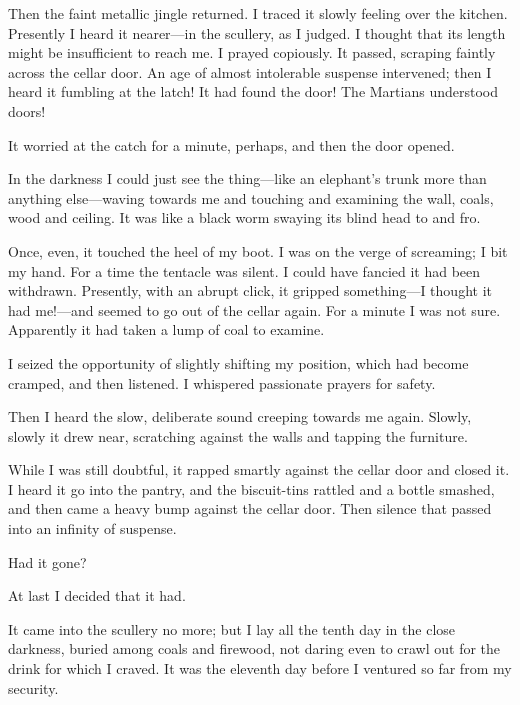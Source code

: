 Then the faint metallic jingle returned. I traced it slowly feeling over the kitchen. Presently I heard it nearer—in the scullery, as I judged. I thought that its length might be insufficient to reach me. I prayed copiously. It passed, scraping faintly across the cellar door. An age of almost intolerable suspense intervened; then I heard it fumbling at the latch! It had found the door! The Martians understood doors!

It worried at the catch for a minute, perhaps, and then the door opened.

In the darkness I could just see the thing—like an elephant's trunk more than anything else—waving towards me and touching and examining the wall, coals, wood and ceiling. It was like a black worm swaying its blind head to and fro.

Once, even, it touched the heel of my boot. I was on the verge of screaming; I bit my hand. For a time the tentacle was silent. I could have fancied it had been withdrawn. Presently, with an abrupt click, it gripped something—I thought it had me!—and seemed to go out of the cellar again. For a minute I was not sure. Apparently it had taken a lump of coal to examine.

I seized the opportunity of slightly shifting my position, which had become cramped, and then listened. I whispered passionate prayers for safety.

Then I heard the slow, deliberate sound creeping towards me again. Slowly, slowly it drew near, scratching against the walls and tapping the furniture.

While I was still doubtful, it rapped smartly against the cellar door and closed it. I heard it go into the pantry, and the biscuit-tins rattled and a bottle smashed, and then came a heavy bump against the cellar door. Then silence that passed into an infinity of suspense.

Had it gone?

At last I decided that it had.

It came into the scullery no more; but I lay all the tenth day in the close darkness, buried among coals and firewood, not daring even to crawl out for the drink for which I craved. It was the eleventh day before I ventured so far from my security.

